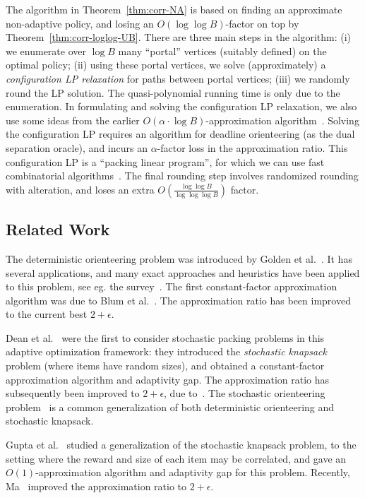 \documentclass[11pt,letterpaper]{article}
\numberwithin{algorithm}{section}
\begin{document}
The algorithm in Theorem~\ref{thm:corr-NA} is based on finding an approximate non-adaptive policy, and losing an $O(\log\log B)$-factor on top by Theorem~\ref{thm:corr-loglog-UB}. There are three main steps in the algorithm: (i) we enumerate over $\log B$ many ``portal'' vertices (suitably defined) on the optimal policy; (ii) using these portal vertices, we solve (approximately) a {\em configuration LP relaxation} for paths between portal vertices; (iii) we randomly round the LP solution. The quasi-polynomial running time is only due to the enumeration. In formulating and solving the configuration LP relaxation, we also use some ideas from the earlier $O(\alpha\cdot \log B)$-approximation algorithm~\cite{GKNR12}. Solving the configuration LP requires an algorithm for deadline orienteering (as the dual separation oracle), and incurs an $\alpha$-factor loss in the approximation ratio.
This configuration LP is a ``packing linear program'', for which we can use fast combinatorial algorithms~\cite{PST91,GK07}. The final rounding step involves randomized rounding with alteration, and loses an extra $O(\frac{\log\log B}{\log\log\log B})$ factor.


\subsection{Related Work}
\label{s:prev-work}
The deterministic orienteering problem was introduced by Golden et al.~\cite{GLV87}. It has several applications, and many exact approaches and heuristics have been applied to this problem, see eg. the survey~\cite{VSO11}. The first constant-factor approximation algorithm was due to Blum et al.~\cite{BCKLMM07}. The approximation ratio has been improved~\cite{BBCM04,CKP08} to the current best $2+\epsilon$.



Dean et al.~\cite{DeanGV08} were the first to consider stochastic packing problems in this adaptive optimization framework: they introduced the {\em stochastic knapsack} problem (where items have random sizes), and obtained a constant-factor approximation algorithm and adaptivity gap. The approximation ratio has subsequently been improved to $2+\epsilon$, due to~\cite{BGK11,Bhalgat11}. The stochastic orienteering problem~\cite{GKNR12} is a common generalization of both deterministic orienteering and stochastic knapsack.



Gupta et al.~\cite{GKMR11} studied a generalization of the stochastic knapsack problem, to the setting where the reward and size of each item  may be correlated, and gave an $O(1)$-approximation algorithm and adaptivity gap for this problem.
Recently, Ma~\cite{M14} improved the approximation ratio to $2+\epsilon$.
\end{document}
